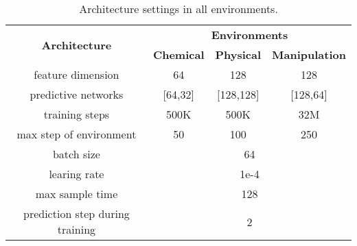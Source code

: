 \begin{table}[h]
\caption{Architecture settings in all environments.}
\label{tab:arch}
\renewcommand{\arraystretch}{1.3}
\setlength{\tabcolsep}{7pt} %
\centering
\begin{tabular}{cccc}
\hline
\multirow{2}{*}{\textbf{Architecture}} & \multicolumn{3}{c}{\textbf{Environments}}           \\ \cline{2-4} 
                               & \textbf{Chemical}    & \textbf{Physical}     & \textbf{Manipulation}  \\ \hline
feature dimension              & 64          & 128          & 128           \\ 
predictive networks            & {[}64,32{]} & {[}128,128{]} & {[}128,64{]} \\ 
training steps                  & 500K        & 500K          & 32M          \\ 
max step of environment                   & 50        & 100           & 250          \\ 
batch size                     & \multicolumn{3}{c}{64}                     \\ 
learing rate                   & \multicolumn{3}{c}{1e-4}                   \\ 
max sample time                 & \multicolumn{3}{c}{128}                   \\ 
prediction step during training               & \multicolumn{3}{c}{2}                      \\ \hline
\end{tabular}
\end{table}

